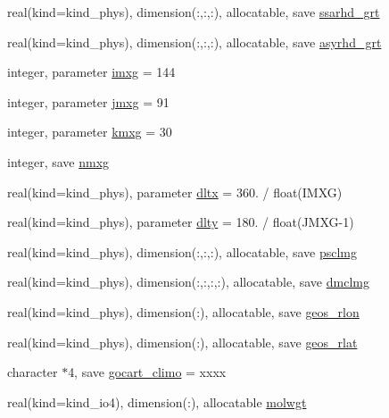 \begin{DoxyCompactItemize}
\item 
real(kind=kind\+\_\+phys), dimension(\+:,\+:,\+:), allocatable, save \hyperlink{namespacemodule__radiation__aerosols_a4aa91ab1d0b9d71c704dc565ef4704bf}{ssarhd\+\_\+grt}
\item 
real(kind=kind\+\_\+phys), dimension(\+:,\+:,\+:), allocatable, save \hyperlink{namespacemodule__radiation__aerosols_a2da45b8bd425415ca417f6590cc54da6}{asyrhd\+\_\+grt}
\item 
integer, parameter \hyperlink{namespacemodule__radiation__aerosols_aa7b2e0e1d0669af4efc75cb32301f1f1}{imxg} = 144
\item 
integer, parameter \hyperlink{namespacemodule__radiation__aerosols_a816ee06781e63adf8752a9a67ab2da2d}{jmxg} = 91
\item 
integer, parameter \hyperlink{namespacemodule__radiation__aerosols_a5339e589d92fab8cbb310b84b6ca3d9e}{kmxg} = 30
\item 
integer, save \hyperlink{namespacemodule__radiation__aerosols_adb4c4cdc8e3212777229d1f54e79bb05}{nmxg}
\item 
real(kind=kind\+\_\+phys), parameter \hyperlink{namespacemodule__radiation__aerosols_a084315fde4afcad23cd3aeb18a4d8a4e}{dltx} = 360. / float(I\+M\+XG)
\item 
real(kind=kind\+\_\+phys), parameter \hyperlink{namespacemodule__radiation__aerosols_a499bb3c75e9802c5ee7fd6cdb6660f7e}{dlty} = 180. / float(J\+M\+XG-\/1)
\item 
real(kind=kind\+\_\+phys), dimension(\+:,\+:,\+:), allocatable, save \hyperlink{namespacemodule__radiation__aerosols_a942aa3a9f61cb40592bd0879a91c2ede}{psclmg}
\item 
real(kind=kind\+\_\+phys), dimension(\+:,\+:,\+:,\+:), allocatable, save \hyperlink{namespacemodule__radiation__aerosols_a123d552c7f98f7371565f4e2017efd45}{dmclmg}
\item 
real(kind=kind\+\_\+phys), dimension(\+:), allocatable, save \hyperlink{namespacemodule__radiation__aerosols_a1a0e35ab33517e765898870b8b1ab1ad}{geos\+\_\+rlon}
\item 
real(kind=kind\+\_\+phys), dimension(\+:), allocatable, save \hyperlink{namespacemodule__radiation__aerosols_aef43bfbd28ef9b87e8d6973ba7331a18}{geos\+\_\+rlat}
\item 
character $\ast$4, save \hyperlink{namespacemodule__radiation__aerosols_ab8118108e60a4795a8caa5af71232399}{gocart\+\_\+climo} = \textquotesingle{}xxxx\textquotesingle{}
\item 
real(kind=kind\+\_\+io4), dimension(\+:), allocatable \hyperlink{namespacemodule__radiation__aerosols_a166e63abaa518ec795f8eea6d115f03c}{molwgt}

\end{DoxyCompactItemize}
